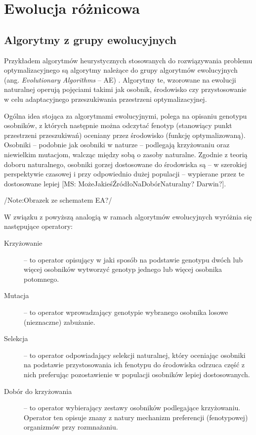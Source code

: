 \documentclass[12pt,a4paper]{report}
\begin{document}
{{%
\section{Ewolucja różnicowa}
\label{DEvolChapter}

\subsection{Algorytmy z grupy ewolucyjnych}
\par{
Przykładem algorytmów heurystycznych stosowanych do rozwiązywania problemu optymalizacyjnego są algorytmy należące do grupy algorytmów ewolucyjnych (ang. \emph{Evolutionary Algorithms} -- AE) \cite{WykladyEvol,SpringerIntroToEvol}. Algorytmy te, wzorowane na ewolucji naturalnej operują pojęciami takimi jak osobnik, środowisko czy przystosowanie w celu adaptacyjnego przeszukiwania przestrzeni optymalizacyjnej.
}
\par{
Ogólna idea stojąca za algorytmami ewolucyjnymi, polega na opisaniu genotypu osobników, z których następnie można odczytać fenotyp (stanowiący punkt przestrzeni przeszukiwań) oceniany przez środowisko (funkcję optymalizowaną). Osobniki -- podobnie jak osobniki w naturze -- podlegają krzyżowaniu oraz niewielkim mutacjom, walcząc między sobą o zasoby naturalne. Zgodnie z teorią doboru naturalnego, osobniki gorzej dostosowane do środowiska są -- w szerokiej perspektywie czasowej i przy odpowiednio dużej populacji -- wypierane przez te dostosowane lepiej [MS: MożeJakieśŹródłoNaDobórNaturalny? Darwin?].
}
\par{
/Note:Obrazek ze schematem EA?/
}
\par{
W związku z powyższą analogią w ramach algorytmów ewolucyjnych wyróżnia się następujące operatory:
\begin{description}
  \item[Krzyżowanie] -- to operator opisujący w jaki sposób na podstawie genotypu dwóch lub więcej osobników wytworzyć genotyp jednego lub więcej osobnika potomnego.
  \item[Mutacja] -- to operator wprowadzający genotypie wybranego osobnika losowe (nieznaczne) zabużanie.
  \item[Selekcja] -- to operator odpowiadający selekcji naturalnej, który oceniając osobniki na podstawie przystosowania ich fenotypu do środowiska odrzuca część z nich preferując pozostawienie w populacji osobników lepiej dostosowanych.
  \item[Dobór do krzyżowania] -- to operator wybierający zestawy osobników podlegające krzyżowaniu. Operator ten opisuje znany z natury mechanizm preferencji (fenotypowej) organizmów przy rozmnażaniu.

\end{description}}}}
\end{document}
